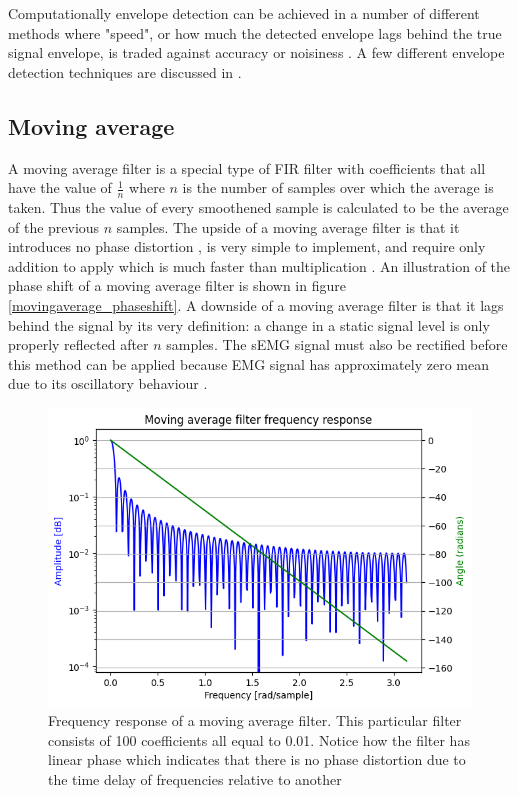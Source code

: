 Computationally envelope detection can be achieved in a number of different methods where "speed", or how much the detected envelope lags behind the true signal envelope, is traded against accuracy or noisiness \cite{dsp_good_bad_ugly}. A few different envelope detection techniques are discussed in \cite{rose2011electromyogram}.

\subsection{Moving average}
A moving average filter is a special type of FIR filter with coefficients that all have the value of $\frac{1}{n}$ where $n$ is the number of samples over which the average is taken. Thus the value of every smoothened sample is calculated to be the average of the previous $n$ samples. The upside of a moving average filter is that it introduces no phase distortion \cite{fir_filter_properties}, is very simple to implement, and require only addition to apply which is much faster than multiplication \cite{smith_moving_average_filters}. An illustration of the phase shift of a moving average filter is shown in figure \ref{movingaverage_phaseshift}. A downside of a moving average filter is that it lags behind the signal by its very definition: a change in a static signal level is only properly reflected after $n$ samples.  The sEMG signal must also be rectified before this method can be applied because EMG signal has approximately zero mean due to its oscillatory behaviour \cite{rose2011electromyogram}.

\begin{figure}[h!t]
	\begin{center}
		\includegraphics[width=0.7\columnwidth]{images/movingaverage_phaseshift.png}
	\end{center}
	\caption{Frequency response of a moving average filter. This particular filter consists of 100 coefficients all equal to 0.01. Notice how the filter has linear phase which indicates that there is no phase distortion due to the time delay of frequencies relative to another \cite{fir_filter_properties}}
	\label{fig:movingaverage_phaseshift}
\end{figure}




